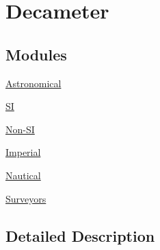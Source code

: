 \hypertarget{group___e_g_x_math-_conversions-_length_conversions-_s_i-_decameter}{}\section{Decameter}
\label{group___e_g_x_math-_conversions-_length_conversions-_s_i-_decameter}
\subsection*{Modules}
\begin{DoxyCompactItemize}
\item 
\mbox{\hyperlink{group___e_g_x_math-_conversions-_length_conversions-_s_i-_decameter-_astronomical}{Astronomical}}
\item 
\mbox{\hyperlink{group___e_g_x_math-_conversions-_length_conversions-_s_i-_decameter-_s_i}{SI}}
\item 
\mbox{\hyperlink{group___e_g_x_math-_conversions-_length_conversions-_s_i-_decameter-_non-_s_i}{Non-\/\+SI}}
\item 
\mbox{\hyperlink{group___e_g_x_math-_conversions-_length_conversions-_s_i-_decameter-_imperial}{Imperial}}
\item 
\mbox{\hyperlink{group___e_g_x_math-_conversions-_length_conversions-_s_i-_decameter-_nautical}{Nautical}}
\item 
\mbox{\hyperlink{group___e_g_x_math-_conversions-_length_conversions-_s_i-_decameter-_surveyors}{Surveyors}}
\end{DoxyCompactItemize}


\subsection{Detailed Description}
